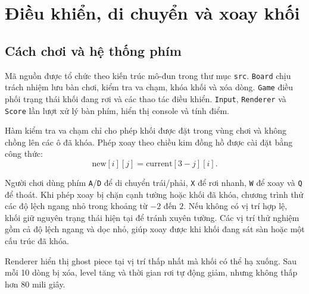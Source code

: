 \section{Điều khiển, di chuyển và xoay khối}

\subsection{Cách chơi và hệ thống phím}

Mã nguồn được tổ chức theo kiến trúc mô-đun trong thư mục \texttt{src}.
\texttt{Board} chịu trách nhiệm lưu bàn chơi, kiểm tra va chạm, khóa khối và
xóa dòng. \texttt{Game} điều phối trạng thái khối đang rơi và các thao tác
điều khiển. \texttt{Input}, \texttt{Renderer} và \texttt{Score} lần lượt xử lý
bàn phím, hiển thị console và tính điểm.

Hàm kiểm tra va chạm chỉ cho phép khối được đặt trong vùng chơi và không
chồng lên các ô đã khóa. Phép xoay theo chiều kim đồng hồ được cài đặt bằng
công thức:
\[
    \mathrm{new}[i][j] = \mathrm{current}[3-j][i].
\]

Người chơi dùng phím \texttt{A}/\texttt{D} để di chuyển trái/phải,
\texttt{X} để rơi nhanh, \texttt{W} để xoay và \texttt{Q} để thoát. Khi phép
xoay bị chặn cạnh tường hoặc khối đã khóa, chương trình thử các độ lệch ngang
nhỏ trong khoảng từ $-2$ đến $2$. Nếu không có vị trí hợp lệ, khối giữ nguyên
trạng thái hiện tại để tránh xuyên tường. Các vị trí thử nghiệm gồm cả độ lệch
ngang và dọc nhỏ, giúp xoay được khi khối đang sát sàn hoặc một cấu trúc đã
khóa.

Renderer hiển thị ghost piece tại vị trí thấp nhất mà khối có thể hạ xuống.
Sau mỗi 10 dòng bị xóa, level tăng và thời gian rơi tự động giảm, nhưng
không thấp hơn 80 mili giây.
